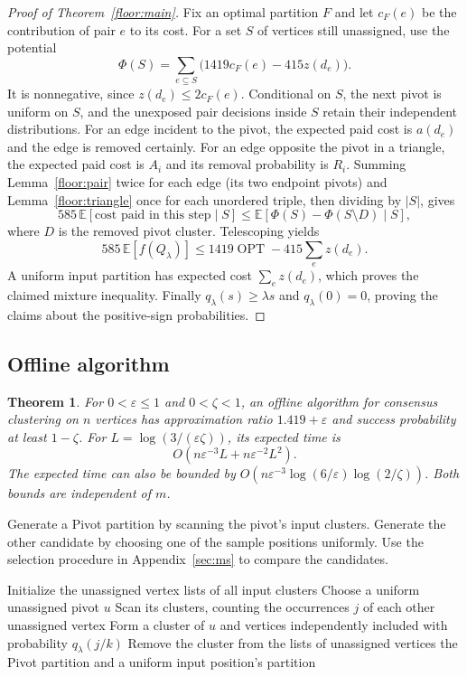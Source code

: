 \documentclass[11pt]{article}
\newtheorem{theorem}{Theorem}[section]
\begin{document}
\begin{proof}[Proof of Theorem~\ref{floor:main}]
Fix an optimal partition $F$ and let $c_F(e)$ be the contribution
of pair $e$ to its cost. For a set $S$ of vertices still unassigned,
use the potential
\[
 \Phi(S)=\sum_{e\subseteq S}\bigl(1419c_F(e)-415z(d_e)\bigr).
\]
It is nonnegative, since $z(d_e)\le2c_F(e)$.  Conditional on $S$, the
next pivot is uniform on $S$, and the unexposed pair decisions inside
$S$ retain their independent distributions.  For an edge incident to
the pivot, the expected paid cost is $a(d_e)$ and the edge is removed
certainly.  For an edge opposite the pivot in a triangle, the expected
paid cost is $A_i$ and its removal probability is $R_i$.  Summing
Lemma~\ref{floor:pair} twice for each edge (its two endpoint pivots) and
Lemma~\ref{floor:triangle} once for each unordered triple, then dividing
by $|S|$, gives
\[
 585\,\mathbb E[\text{cost paid in this step}\mid S]
 \le\mathbb E[\Phi(S)-\Phi(S\setminus D)\mid S],
\]
where $D$ is the removed pivot cluster.  Telescoping yields
\[
 585\,\mathbb E[f(Q_\lambda)]
 \le1419\operatorname{OPT}-415\sum_e z(d_e).
\]
A uniform input partition has expected cost $\sum_e z(d_e)$, which
proves the claimed mixture inequality.  Finally $q_\lambda(s)\ge\lambda s$
and $q_\lambda(0)=0$, proving the claims about the positive-sign probabilities.
\end{proof}

\subsection{Offline algorithm}
\begin{theorem}
\label{fastnew:offline}
For $0<\varepsilon\le1$ and $0<\zeta<1$, an offline algorithm for
consensus clustering on $n$ vertices has approximation ratio
$1.419+\varepsilon$ and success probability
at least $1-\zeta$. For $L=\log(3/(\varepsilon\zeta))$, its expected time is
\[
 O\!\left(n\varepsilon^{-3}L+n\varepsilon^{-2}L^2\right).
\]
The expected time can also be bounded by
$O(n\varepsilon^{-3}\log(6/\varepsilon)\log(2/\zeta))$.
Both bounds are independent of $m$.
\end{theorem}
Generate a Pivot partition by scanning the pivot's input clusters.
Generate the other candidate by choosing one of the sample positions
uniformly. Use the selection procedure in Appendix~\ref{sec:ms} to compare
the candidates.

\begin{algorithm}[htbp]
\caption{Producing the candidates using sampled input partitions on one sample}
\label{alg:vote}
\begin{algorithmic}[1]
\State Initialize the unassigned vertex lists of all input clusters
    \State Choose a uniform unassigned pivot $u$
    \State Scan its clusters, counting the occurrences $j$ of each other unassigned vertex
    \State Form a cluster of $u$ and vertices independently included with probability $q_\lambda(j/k)$
    \State Remove the cluster from the lists of unassigned vertices
\EndWhile
\State \Return the Pivot partition and a uniform input position's partition
\end{algorithmic}
\end{algorithm}
\end{document}
